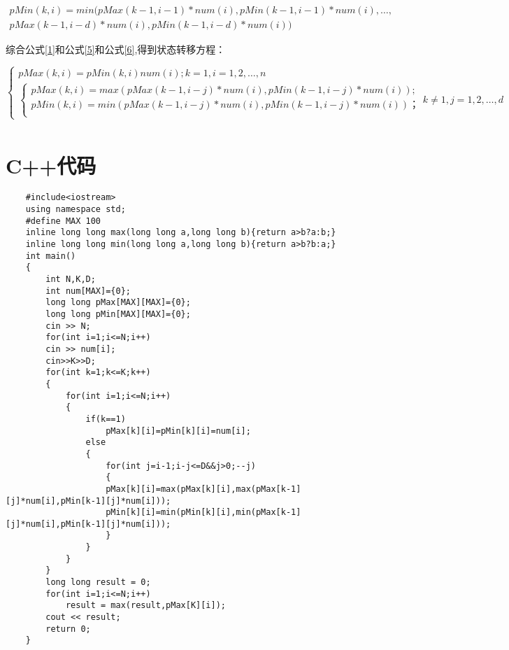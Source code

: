 \documentclass{article}
\begin{document}
	\begin{equation}
	\begin{split}
	pMin(k,i)=min(pMax(k-1,i-1)*num(i),pMin(k-1,i-1)*num(i),\ldots,\\
	pMax(k-1,i-d)*num(i),pMin(k-1,i-d)*num(i))
	\end{split}
	\label{6}
	\end{equation}

	综合公式\ref{1}和公式\ref{5}和公式\ref{6},得到状态转移方程：
	
	\begin{equation*}
	\begin{cases}
		pMax(k,i)=pMin(k,i)num(i); k=1,i=1,2,\ldots,n \\
		\begin{cases}
		pMax(k,i)=max(pMax(k-1,i-j)*num(i),pMin(k-1,i-j)*num(i));\\
		pMin(k,i)=min(pMax(k-1,i-j)*num(i),pMin(k-1,i-j)*num(i))；\\	
		\end{cases}k\neq 1,j=1,2,\ldots,d
	\end{cases}
	\end{equation*}
	\begin{align*}
	\end{align*}
	
	\section{C++代码}
	
	\begin{lstlisting}
	#include<iostream>
	using namespace std;
	#define MAX 100
	inline long long max(long long a,long long b){return a>b?a:b;}
	inline long long min(long long a,long long b){return a>b?b:a;}
	int main()
	{
		int N,K,D;
		int num[MAX]={0};
		long long pMax[MAX][MAX]={0};
		long long pMin[MAX][MAX]={0};
		cin >> N;
		for(int i=1;i<=N;i++)
		cin >> num[i];
		cin>>K>>D;
		for(int k=1;k<=K;k++)
		{
			for(int i=1;i<=N;i++)
			{
				if(k==1)
					pMax[k][i]=pMin[k][i]=num[i];
				else
				{
					for(int j=i-1;i-j<=D&&j>0;--j)
					{
					pMax[k][i]=max(pMax[k][i],max(pMax[k-1][j]*num[i],pMin[k-1][j]*num[i]));
					pMin[k][i]=min(pMin[k][i],min(pMax[k-1][j]*num[i],pMin[k-1][j]*num[i]));
					}
				}
			}
		}
		long long result = 0;
		for(int i=1;i<=N;i++)
			result = max(result,pMax[K][i]);
		cout << result;
		return 0;
	}	
	\end{lstlisting}
\end{document}
